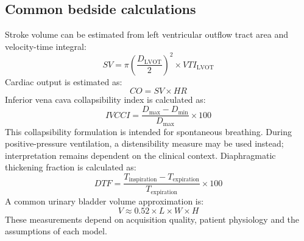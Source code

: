 \subsection{Common bedside calculations}
Stroke volume can be estimated from left ventricular outflow tract area and velocity-time integral:
\[
SV=\pi\left(\frac{D_{\mathrm{LVOT}}}{2}\right)^2\times VTI_{\mathrm{LVOT}}
\]
Cardiac output is estimated as:
\[
CO=SV\times HR
\]
Inferior vena cava collapsibility index is calculated as:
\[
IVCCI=\frac{D_{\max}-D_{\min}}{D_{\max}}\times100
\]
This collapsibility formulation is intended for spontaneous breathing. During positive-pressure ventilation, a distensibility measure may be used instead; interpretation remains dependent on the clinical context.
Diaphragmatic thickening fraction is calculated as:
\[
DTF=\frac{T_{\mathrm{inspiration}}-T_{\mathrm{expiration}}}{T_{\mathrm{expiration}}}\times100
\]
A common urinary bladder volume approximation is:
\[
V\approx0.52\times L\times W\times H
\]
These measurements depend on acquisition quality, patient physiology and the assumptions of each model.

